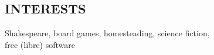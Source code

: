 \documentclass[centered, margin, 11pt]{res} %
\begin{document}
\begin{resume}

\section{INTERESTS}
Shakespeare, board games, homesteading, science fiction, \\
free (libre) software


\end{resume}
\end{document}
